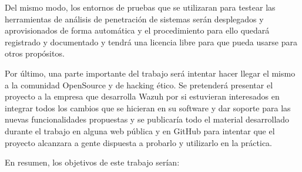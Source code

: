 Del mismo modo, los entornos de pruebas que se utilizaran para testear las herramientas de análisis de penetración de sistemas serán desplegados y aprovisionados de forma automática y el procedimiento para ello quedará registrado y documentado y tendrá una licencia libre para que pueda usarse para otros propósitos.

Por último, una parte importante del trabajo será intentar hacer llegar el mismo a la comunidad OpenSource y de hacking ético. Se pretenderá presentar el proyecto a la empresa que desarrolla Wazuh por si estuvieran interesados en integrar todos los cambios que se hicieran en su software y dar soporte para las nuevas funcionalidades propuestas y se publicaría todo el material desarrollado durante el trabajo en alguna web pública y en GitHub para intentar que el proyecto alcanzara a gente dispuesta a probarlo y utilizarlo en la práctica.

En resumen, los objetivos de este trabajo serían:

